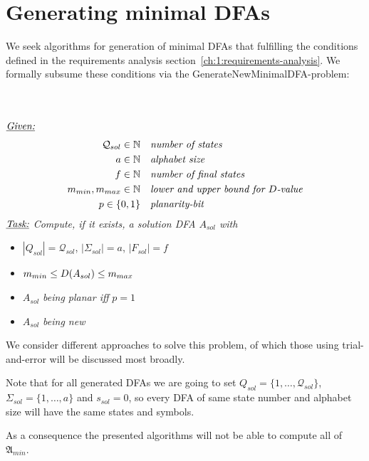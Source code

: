 
\chapter{Generating minimal DFAs} \label{ch:3}

We seek algorithms for generation of minimal DFAs that fulfilling the conditions defined in the requirements analysis section~\ref{ch:1:requirements-analysis}. We formally subsume these conditions via the GenerateNewMinimalDFA-problem:
\begin{definition}[GenerateNewMinimalDFA] $ $ \\
	$ $ \vspace{-0.4cm} \\
	\noindent $\underline{\emph{Given:}}$
	\vspace{-0.5cm}
	\begin{align*}
	\mathcal{Q}_{sol} \in \mathbb{N}\ \ \ & \emph{number of states} \\
	a \in \mathbb{N}\ \ \ & \emph{alphabet size} \\
	f \in \mathbb{N}\ \ \ & \emph{number of final states} \\
	m_{min}, m_{max} \in \mathbb{N}\ \ \ & \emph{lower and upper bound for $D$-value} \\
	p \in \{0,1\}\ \ \ & \emph{planarity-bit}
	\end{align*}
	\noindent $\underline{\emph{Task:}}$ \emph{Compute, if it exists, a solution DFA $A_{sol}$ with}
	\begin{itemize}
		\item $|Q_{sol}|=\mathcal{Q}_{sol}$, $|\Sigma_{sol}|=a$, $|F_{sol}|=f$
		\item $m_{min} \le D(A_{sol}) \le m_{max}$
		\item $A_{sol}$ \emph{being planar iff} $p = 1$
		\item $A_{sol}$ \emph{being new}
	\end{itemize}
\end{definition}
\noindent We consider different approaches to solve this problem, of which those using trial-and-error will be discussed most broadly.

\begin{remark}\label{ch:2:rem:qas-set}
	Note that for all generated DFAs we are going to set $Q_{sol} = \{1,\ldots,\mathcal{Q}_{sol}\}$, $\Sigma_{sol} = \{1,\ldots,a\}$ and $s_{sol} = 0$, so every DFA of same state number and alphabet size will have the same states and symbols.
\end{remark}
\noindent As a consequence the presented algorithms will not be able to compute all of $\mathfrak{A}_{min}$.

